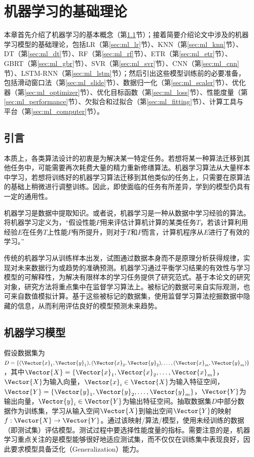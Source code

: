 \chapter{机器学习的基础理论}\label{chap:ml_theory}

本章首先介绍了机器学习的基本概念（第\ref{sec:ml_intro}节）；接着简要介绍论文中涉及的机器学习模型的基础理论，包括LR（第\ref{sec:ml_lr}节）、KNN（第\ref{sec:ml_knn}节）、DT（第\ref{sec:ml_dt}节）、RF（第\ref{sec:ml_rf}节）、ETR（第\ref{sec:ml_etr}节）、GBRT（第\ref{sec:ml_gbr}节）、SVR（第\ref{sec:ml_svr}节）、CNN（第\ref{sec:ml_cnn}节）、LSTM-RNN（第\ref{sec:ml_lstm}节）；然后引出这些模型训练前的必要准备，包括滑动窗口法（第\ref{sec:ml_slide}节）、数据归一化（第\ref{sec:ml_scaler}节）、优化器（第\ref{sec:ml_optimizer}节）、优化目标函数（第\ref{sec:ml_loss}节）、性能度量（第\ref{sec:ml_performance}节）、欠拟合和过拟合（第\ref{sec:ml_fitting}节）、计算工具与平台（第\ref{sec:ml_computer}节）。

\section{引言}\label{sec:ml_intro}

本质上，各类算法设计的初衷是为解决某一特定任务。若想将某一种算法迁移到其他任务中，可能需要再次耗费大量的精力重新修缮算法。机器学习算法从大量样本中学习，若想将训练好的机器学习算法迁移到其他类似的任务上，只需要在原算法的基础上稍微进行调整训练。因此，即使面临的任务有所差异，学到的模型仍具有一定的通用性\citep{Goodfellow2016Deep}。

机器学习是数据中提取知识。或者说，机器学习是一种从数据中学习经验的算法。\citet{Mitchell1997Machine}将机器学习定义为，“假设性能$P$用来评估计算机计算的某类任务$T$，若该计算利用经验$E$在任务$T$上性能$P$有所提升，则对于$T$和$P$而言，计算机程序从$E$进行了有效的学习。”

传统的机器学习从训练样本出发，试图通过数据本身而不是原理分析获得规律，实现对未来数据行为或趋势的准确预测。机器学习通过平衡学习结果的有效性与学习模型的可解释性，为解决有限样本的学习任务提供了研究范式。基于本论文的研究对象，研究方法将重点集中在监督学习算法上。被标记的数据可来自实际观测，也可来自数值模拟计算。基于这些被标记的数据集，使用监督学习算法挖掘数据中隐藏的信息，从而利用评估良好的模型预测未来趋势。

\section{机器学习模型}\label{sec:ml}

假设数据集为$D=\{(\Vector{x}_1,\Vector{y}_1),(\Vector{x}_2,\Vector{y}_2),\ldots,(\Vector{x}_m,\Vector{y}_m)\}$，其中$\Vector{X}=\{\Vector{x}_1,\Vector{x}_2,\ldots,\Vector{x}_m\}$，$\Vector{X}$为输入向量，$\Vector{x}_i\in\Vector{X}$为输入特征空间，$\Vector{Y}=\{\Vector{y}_1,\Vector{y}_2,\ldots,\Vector{y}_m\}$，$\Vector{Y}$为输出向量，$\Vector{y}_i\in\Vector{Y}$为输出特征空间。抽取数据集$D$中部分数据作为训练集，学习从输入空间$\Vector{X}$到输出空间$\Vector{Y}$的映射$f:\Vector{X}\rightarrow\Vector{Y}$。通过该映射/算法/模型，使用未经训练的数据（即测试集）评估模型。测试过程中要选择性能度量的指标。需要注意的是，机器学习重点关注的是模型能够很好地适应测试集，而不仅仅在训练集中表现良好，因此要求模型具备泛化（Generalization）能力。

